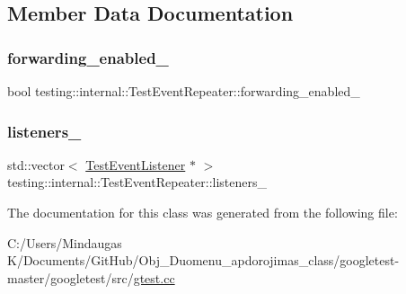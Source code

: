 \subsection{Member Data Documentation}
\mbox{\label{classtesting_1_1internal_1_1_test_event_repeater_a1f7e494642d653eaad800504510d18a3}} 
\subsubsection{\texorpdfstring{forwarding\_enabled\_}{forwarding\_enabled\_}}
{\footnotesize\ttfamily bool testing\+::internal\+::\+Test\+Event\+Repeater\+::forwarding\+\_\+enabled\+\_\+\hspace{0.3cm}{\ttfamily [private]}}

\mbox{\label{classtesting_1_1internal_1_1_test_event_repeater_ac45999606544592544369fa20b11bc26}} 
\subsubsection{\texorpdfstring{listeners\_}{listeners\_}}
{\footnotesize\ttfamily std\+::vector$<$ \mbox{\hyperlink{classtesting_1_1_test_event_listener}{Test\+Event\+Listener}} $\ast$ $>$ testing\+::internal\+::\+Test\+Event\+Repeater\+::listeners\+\_\+\hspace{0.3cm}{\ttfamily [private]}}



The documentation for this class was generated from the following file\+:\begin{DoxyCompactItemize}
\item 
C\+:/\+Users/\+Mindaugas K/\+Documents/\+Git\+Hub/\+Obj\+\_\+\+Duomenu\+\_\+apdorojimas\+\_\+class/googletest-\/master/googletest/src/\mbox{\hyperlink{googletest-master_2googletest_2src_2gtest_8cc}{gtest.\+cc}}\end{DoxyCompactItemize}
